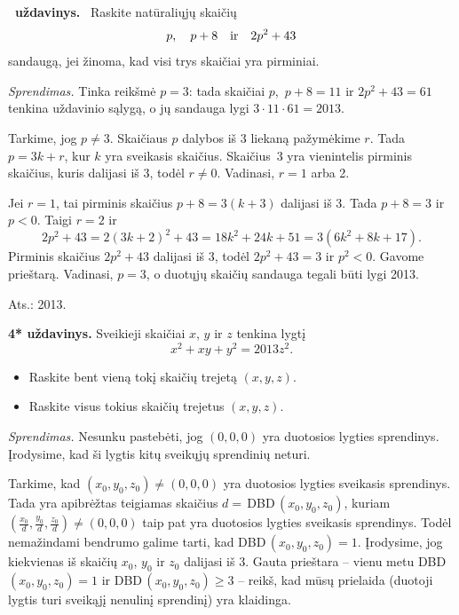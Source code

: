 \documentclass[11pt,a4paper]{article}
\newcounter{uzdavinys}
\newenvironment{uzdavinys}
  {\refstepcounter{uzdavinys}\par\medskip\noindent\textbf{\theuzdavinys\ uždavinys.}\ }
  {\par\medskip}
\begin{document}
\begin{uzdavinys}
Raskite natūraliųjų skaičių \vspace{-3pt}
\[
p,\quad p+8 \quad\text{ir}\quad 2p^2+43 \vspace{-3pt}
\]
sandaugą, jei 
 žinoma, kad visi trys skaičiai yra pirminiai.
\end{uzdavinys}

\textit{Sprendimas.} 
Tinka reikšmė $p = 3$: tada skaičiai $p$,
\,$p+8 = 11$ ir $2p^2+43 = 61$ tenkina uždavinio sąlygą, 
o jų sandauga lygi $3\cdot 11 \cdot 61 = 2013$. 

Tarkime, jog 
$p\ne 3$. Skaičiaus $p$ dalybos iš 3 liekaną pažymėkime $r$. Tada  $p = 3k+r$, kur $k$ yra sveikasis skaičius. Skaičius~3 yra vienintelis 
pirminis skaičius, kuris dalijasi iš 3, todėl $r \ne 0$. Vadinasi, $r=1$ arba 2.

Jei $r=1$, tai pirminis skaičius $p+8=3(k+3)$ dalijasi iš 3. Tada $p+8=3$ ir $p<0$. Taigi $r=2$ ir 
$$2p^2+43 = 2(3k + 2)^2 + 43 =18k^2 + 24k + 51 = 3(6k^2 + 8k + 17).$$
Pirminis skaičius $2p^2+43$ dalijasi iš 3, todėl $2p^2+43=3$ ir $p^2<0$. Gavome prieštarą. Vadinasi, 
$p=3$, o duotųjų skaičių sandauga tegali būti lygi 2013.
       \begin{flushright}
     Ats.: 2013.
    \end{flushright}
\vspace{5.5mm}

\textbf{4* uždavinys.} Sveikieji skaičiai $x$, $y$ ir $z$ tenkina lygtį 
\[
x^2 + xy + y^2 = 2013 z^2.
\]
\begin{itemize}
\item[a)] Raskite bent vieną tokį skaičių trejetą $(x,y,z)$.
\item[b)] Raskite visus tokius skaičių trejetus $(x,y,z)$.
\end{itemize}
\vspace{2.3mm}   
   
\textit{Sprendimas.} 
Nesunku pastebėti, jog $(0,0,0)$ yra duotosios lygties sprendinys. Įrodysime, kad ši lygtis kitų sveikųjų sprendinių neturi.

Tarkime, kad $(x_0,y_0,z_0)\neq(0, 0, 0)$ yra duotosios lygties sveikasis sprendinys. Tada yra apibrėžtas teigiamas skaičius $d =$\,DBD\,$(x_0,y_0,z_0)$, kuriam $\left(\frac{x_0}d, \frac{y_0}d, \frac{z_0}d\right)\neq(0, 0, 0)$ taip pat yra duotosios lygties sveikasis sprendinys. Todėl nemažindami bendrumo galime tarti, kad DBD\,$(x_0,y_0,z_0)=1$. Įrodysime, jog kiekvienas 
iš skaičių $x_0$, $y_0$ ir $z_0$ dalijasi iš 3. Gauta prieštara -- vienu metu DBD\,$(x_0,y_0,z_0)=1$ ir DBD\,$(x_0,y_0,z_0)\geq3$ -- reikš, kad mūsų prielaida (duotoji lygtis turi sveikąjį nenulinį sprendinį) yra klaidinga.
\end{document}
